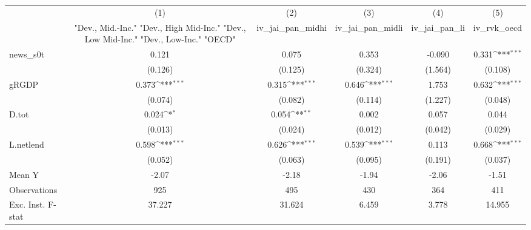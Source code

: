 {
\def\sym#1{\ifmmode^{#1}\else\(^{#1}\)\fi}
\begin{tabular}{l*{5}{c}}
\toprule
            &\multicolumn{1}{c}{(1)}&\multicolumn{1}{c}{(2)}&\multicolumn{1}{c}{(3)}&\multicolumn{1}{c}{(4)}&\multicolumn{1}{c}{(5)}\\
            &\multicolumn{1}{c}{ "Dev., Mid.-Inc." "Dev., High Mid-Inc." "Dev., Low Mid-Inc." "Dev., Low-Inc." "OECD" }&\multicolumn{1}{c}{iv\_jai\_pan\_midhi}&\multicolumn{1}{c}{iv\_jai\_pan\_midli}&\multicolumn{1}{c}{iv\_jai\_pan\_li}&\multicolumn{1}{c}{iv\_rvk\_oecd}\\
\midrule
news\_s0t    &       0.121         &       0.075         &       0.353         &      -0.090         &       0.331\sym{***}\\
            &     (0.126)         &     (0.125)         &     (0.324)         &     (1.564)         &     (0.108)         \\
\addlinespace
gRGDP       &       0.373\sym{***}&       0.315\sym{***}&       0.646\sym{***}&       1.753         &       0.632\sym{***}\\
            &     (0.074)         &     (0.082)         &     (0.114)         &     (1.227)         &     (0.048)         \\
\addlinespace
D.tot       &       0.024\sym{*}  &       0.054\sym{**} &       0.002         &       0.057         &       0.044         \\
            &     (0.013)         &     (0.024)         &     (0.012)         &     (0.042)         &     (0.029)         \\
\addlinespace
L.netlend   &       0.598\sym{***}&       0.626\sym{***}&       0.539\sym{***}&       0.113         &       0.668\sym{***}\\
            &     (0.052)         &     (0.063)         &     (0.095)         &     (0.191)         &     (0.037)         \\
\midrule
Mean Y      &       -2.07         &       -2.18         &       -1.94         &       -2.06         &       -1.51         \\
Observations&         925         &         495         &         430         &         364         &         411         \\
Exc. Inst. F-stat&      37.227         &      31.624         &       6.459         &       3.778         &      14.955         \\
\bottomrule
\end{tabular}
}
